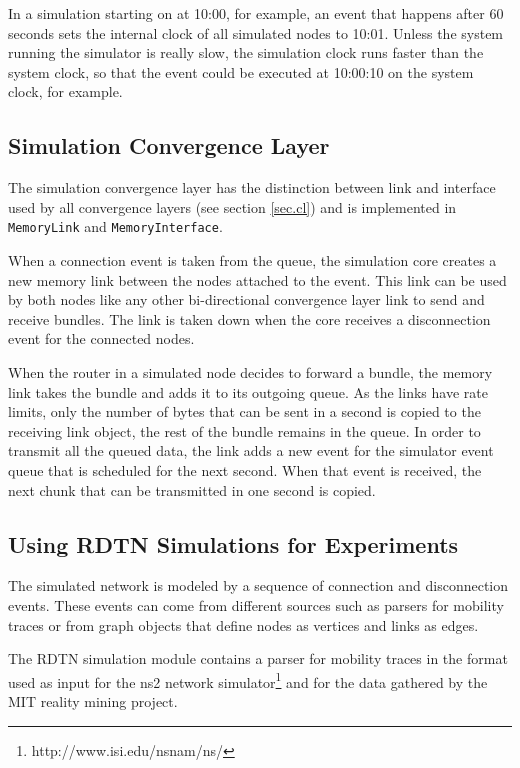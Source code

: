 \documentclass[a4paper]{article}
\begin{document}
In a simulation starting on at 10:00, for example, an event that happens after
60 seconds sets the internal clock of all simulated nodes to 10:01. Unless the
system running the simulator is really slow, the simulation clock runs faster
than the system clock, so that the event could be executed at 10:00:10 on the
system clock, for example.

\subsection{Simulation Convergence Layer}\label{sec.sim.cl}

The simulation convergence layer has the distinction between link and interface
used by all convergence layers (see section \ref{sec.cl}) and is implemented in
{\tt MemoryLink} and {\tt MemoryInterface}.

When a connection event is taken from the queue, the simulation core creates a
new memory link between the nodes attached to the event. This link can be used
by both nodes like any other bi-directional convergence layer link to send and
receive bundles. The link is taken down when the core receives a disconnection
event for the connected nodes.

When the router in a simulated node decides to forward a bundle, the memory link
takes the bundle and adds it to its outgoing queue. As the links have rate
limits, only the number of bytes that can be sent in a second is copied to the
receiving link object, the rest of the bundle remains in the queue. In order to
transmit all the queued data, the link adds a new event for the simulator event
queue that is scheduled for the next second. When that event is received, the
next chunk that can be transmitted in one second is copied.

\subsection{Using RDTN Simulations for Experiments}\label{sec.sim.experiments}

The simulated network is modeled by a sequence of connection and disconnection
events. These events can come from different sources such as parsers for
mobility traces or from graph objects that define nodes as vertices and links as
edges.

The RDTN simulation module contains a parser for mobility traces in the format
used as input for the ns2 network
simulator\footnote{http://www.isi.edu/nsnam/ns/} and for the data gathered by
the MIT reality mining project.
\end{document}
